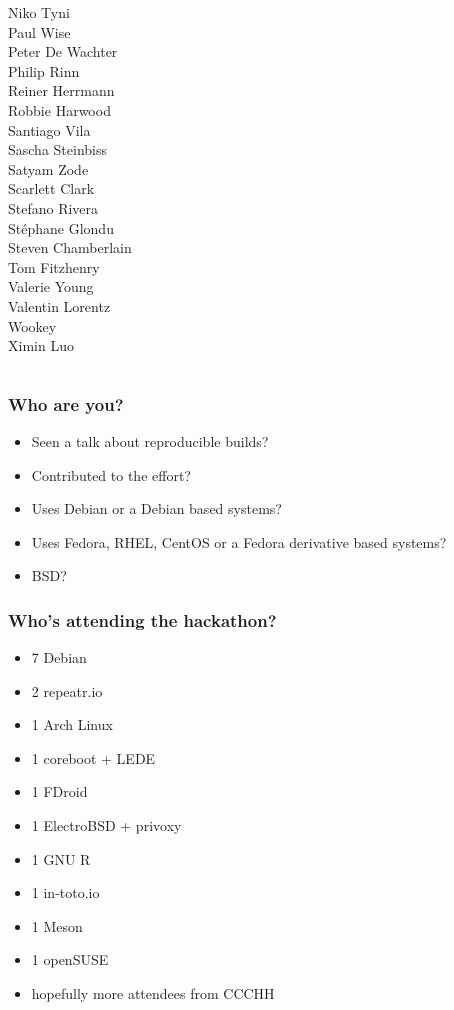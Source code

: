 \documentclass[14pt,aspectratio=169]{beamer}
\newif\ifplacelogo
\begin{document}
\begin{frame}
\begin{center}
\begin{columns}
    Niko Tyni \\
    {Paul Wise} \\
    Peter De Wachter \\
    Philip Rinn \\
    {Reiner Herrmann} \\
    Robbie Harwood \\
    {Santiago Vila} \\
    {Sascha Steinbiss} \\
    {Satyam Zode} \\
    {Scarlett Clark} \\
    {Stefano Rivera} \\
    {Stéphane Glondu} \\
    {Steven Chamberlain} \\
    Tom Fitzhenry \\
    {Valerie Young} \\
    Valentin Lorentz \\
    {Wookey} \\
    {Ximin Luo} \\
  \end{columns}
 \end{center}
\end{frame}


\placelogofalse

\begin{frame}
 \frametitle{Who are you?}
 \begin{itemize}
  \item<2-6> Seen a talk about reproducible builds?
  \item<3-6> Contributed to the effort?
  \item<4-6> Uses Debian or a Debian based systems?
  \item<5-6> Uses Fedora, RHEL, CentOS or a Fedora derivative based systems?
  \item<6> BSD?
 \end{itemize}
\end{frame}

\begin{frame}
 \frametitle{Who's attending the hackathon?}
 \begin{itemize}
  \item 7 Debian
  \item 2 repeatr.io
  \item 1 Arch Linux
  \item 1 coreboot + LEDE
  \item 1 FDroid
  \item 1 ElectroBSD + privoxy
  \item 1 GNU R
  \item 1 in-toto.io
  \item 1 Meson
  \item 1 openSUSE
  \item<2> hopefully more attendees from CCCHH
 \end{itemize}
\end{frame}
\end{document}
